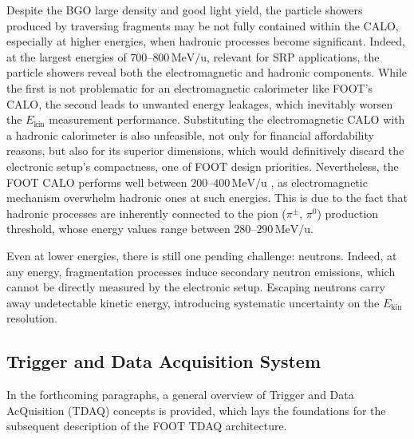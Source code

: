 Despite the BGO large density and good light yield, the particle showers produced by traversing fragments may be not fully contained within the CALO, especially at higher energies, when hadronic processes become significant. Indeed, at the largest energies of $700$--$800\,\mathrm{MeV/u}$, relevant for SRP applications, the particle showers reveal both the electromagnetic and hadronic components. While the first is not problematic for an electromagnetic calorimeter like FOOT's CALO, the second leads to unwanted energy leakages, which inevitably worsen the $E_\text{kin}$ measurement performance. Substituting the electromagnetic CALO with a hadronic calorimeter is also unfeasible, not only for financial affordability reasons, but also for its superior dimensions, which would definitively discard the electronic setup's compactness, one of FOOT design priorities. Nevertheless, the FOOT CALO performs well between $200$--$400\,\mathrm{MeV/u}$ \cite{measurement_impact_foot,UbaldiPhDThesis}, as electromagnetic mechanism overwhelm hadronic ones at such energies. This is due to the fact that hadronic processes are inherently connected to the pion ($\pi^{\pm}$, $\pi^0$) production threshold, whose energy values range between $280$--$290\,\mathrm{MeV/u}$.

Even at lower energies, there is still one pending challenge: neutrons. Indeed, at any energy, fragmentation processes induce secondary neutron emissions, which cannot be directly measured by the electronic setup. Escaping neutrons carry away undetectable kinetic energy, introducing systematic uncertainty on the $E_\text{kin}$ resolution.
\subsection{Trigger and Data Acquisition System}\label{ssec:tdaq_electronic_setup}
In the forthcoming paragraphs, a general overview of Trigger and Data AcQuisition (TDAQ) concepts is provided, which lays the foundations for the subsequent description of the FOOT TDAQ architecture.
